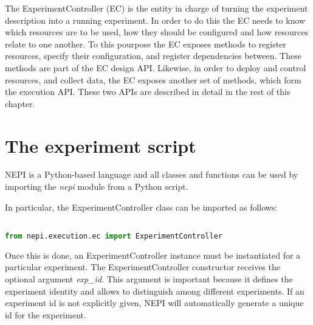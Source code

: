 %
%
%
%
%
%


The ExperimentController (EC) is the entity in charge of turning the 
experiment description into a running experiment. 
In order to do this the EC needs to know which resources are to be 
used, how they should be configured and how resources relate to one another.
To this pourpose the EC exposes methods to register resources, specify their 
configuration, and register dependencies between. These methods are part of
the EC design API.
Likewise, in order to deploy and control resources, and collect data, 
the EC exposes another set of methods, which form the execution API. 
These two APIs are described in detail in the rest of this chapter.

\section{The experiment script}

NEPI is a Python-based language and all classes and functions can
be used by importing the \emph{nepi} module from a Python script.

In particular, the ExperimentController class can be imported as follows:

\begin{lstlisting}[language=Python]

from nepi.execution.ec import ExperimentController

\end{lstlisting}

Once this is done, an ExperimentController instance must be instantiated
for a particular experiment. The ExperimentController constructor receives
the optional argument \emph{exp\_id}. This argument is important because
it defines the experiment identity and allows to distinguish among different
experiments. If an experiment id is not explicitly given, NEPI will automatically
generate a unique id for the experiment. 

